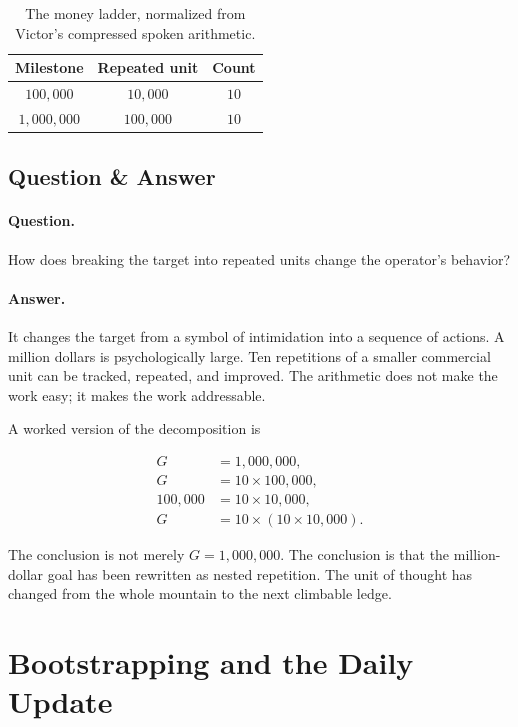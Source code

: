 \begin{table}[h]
\centering
\begin{tabular}{c|c|c}
Milestone & Repeated unit & Count \\
\hline
\(100{,}000\) & \(10{,}000\) & \(10\) \\
\(1{,}000{,}000\) & \(100{,}000\) & \(10\) \\
\end{tabular}
\caption{The money ladder, normalized from Victor's compressed spoken arithmetic.}
\end{table}

\subsection{Question \& Answer}

\paragraph{Question.}
How does breaking the target into repeated units change the operator's behavior?

\paragraph{Answer.}
It changes the target from a symbol of intimidation into a sequence of actions. A million dollars is psychologically large. Ten repetitions of a smaller commercial unit can be tracked, repeated, and improved. The arithmetic does not make the work easy; it makes the work addressable.

A worked version of the decomposition is

\begin{align}
G &= 1{,}000{,}000, \\
G &= 10 \times 100{,}000, \\
100{,}000 &= 10 \times 10{,}000, \\
G &= 10 \times (10 \times 10{,}000).
\end{align}

The conclusion is not merely \(G=1{,}000{,}000\). The conclusion is that the million-dollar goal has been rewritten as nested repetition. The unit of thought has changed from the whole mountain to the next climbable ledge.

\section{Bootstrapping and the Daily Update}

